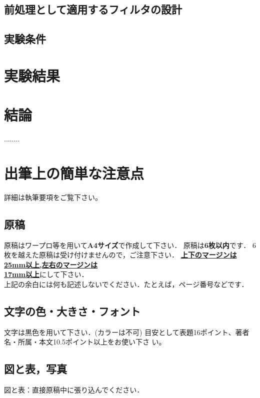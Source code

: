 \documentclass[11pt]{jarticle}
\begin{document}
\subsection{前処理として適用するフィルタの設計}
\hspace{1.0em}

\subsection{実験条件}
\hspace{1.0em}

\section{実験結果}
\hspace{1.0em}

\section{結論}
\hspace{1.0em}

........

\section{出筆上の簡単な注意点}
\hspace{1.0em}
詳細は執筆要項をご覧下さい。

\subsection{原稿}
\hspace{1.0em}
原稿はワープロ等を用いて{\bf A4サイズ}で作成して下さい．
原稿は{\bf 6枚以内}です．
6枚を越えた原稿は受け付けませんので，ご注意下さい．
\underline{\bf 上下のマージンは25mm以上,左右のマージンは}\\
\underline{\bf 17mm以上}にして下さい．\\
上記の余白には何も記述しないでください．たとえば，ページ番号などです．

\subsection{文字の色・大きさ・フォント}
\hspace{1.0em}
文字は黒色を用いて下さい．(カラーは不可)
目安として表題16ポイント、著者名・所属・本文10.5ポイント以上をお使い下さ
い。

\subsection{図と表，写真}
\hspace{1.0em}
図と表：直接原稿中に張り込んでください．
\end{document}
